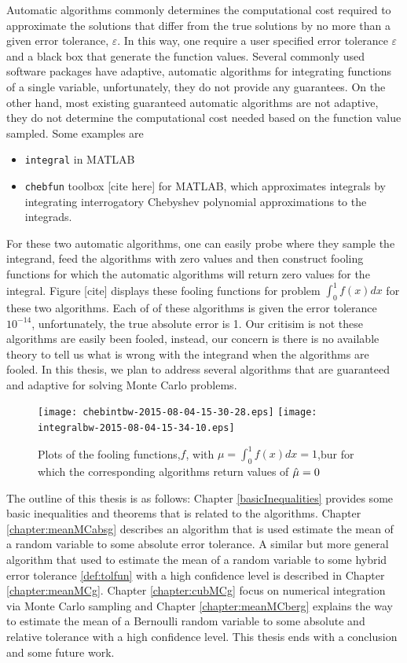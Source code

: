 \documentclass{iitthesis}
\begin{document}
Automatic algorithms commonly determines the computational cost required to approximate the solutions that differ from the true solutions by no more than a given error tolerance, $\varepsilon$. In this way, one require a user specified error tolerance $\varepsilon$ and a black box that generate the function values. Several commonly used software packages have adaptive, automatic algorithms for integrating functions of a single variable, unfortunately, they do not provide any guarantees. On the other hand, most existing guaranteed automatic algorithms are not adaptive, they do not determine the computational cost needed based on the function value sampled. Some examples are
\begin{itemize}
\item {\tt integral} in MATLAB
\item {\tt chebfun} toolbox [cite here] for MATLAB, which approximates integrals by integrating interrogatory Chebyshev polynomial approximations to the integrads.
\end{itemize}
For these two automatic algorithms, one can easily probe where they sample the integrand, feed the algorithms with zero values and then construct fooling functions for which the automatic algorithms will return zero values for the integral. Figure  [cite] displays these fooling functions for problem $\int_0^1f(x)dx$ for these two algorithms. Each of of these algorithms 
is given the error tolerance $10^{-14}$, unfortunately, the true absolute error is 1. Our critisim is not these algorithms are easily been fooled, instead, our concern is there is no available theory to tell us what is wrong with the integrand when the algorithms are fooled. In this thesis, we plan to address several algorithms that are guaranteed and adaptive for solving Monte Carlo problems.
  \begin{figure}[htbp]
    \centering
    \texttt{[image: chebintbw-2015-08-04-15-30-28.eps]} %
\texttt{[image: integralbw-2015-08-04-15-34-10.eps]} 
    \caption{Plots of the fooling functions,$f$, with $\mu = \int_0^1f(x)dx=1$,bur for which the corresponding algorithms return values of $\hat{\mu}=0$}
    \label{fig:ratiovsalpha}
 \end{figure}
 
The outline of this thesis is as follows:  Chapter \ref{basicInequalities} provides some basic inequalities and theorems that is related to the algorithms. Chapter \ref{chapter:meanMCabsg} describes an algorithm that is used estimate the mean of a random variable to some absolute error tolerance. A similar but more general algorithm that used to estimate the mean of a random variable to some hybrid error tolerance \ref{def:tolfun} with a high confidence level is described in Chapter \ref{chapter:meanMCg}. Chapter \ref{chapter:cubMCg} focus on numerical integration via Monte Carlo sampling and 
Chapter \ref{chapter:meanMCberg} explains the way to estimate the mean of a Bernoulli random variable to some absolute and relative tolerance with a high confidence level. This thesis ends with a conclusion and some future work.
\end{document}
